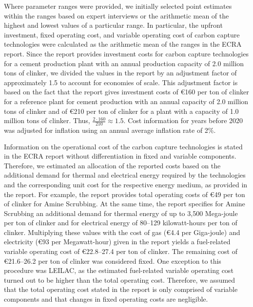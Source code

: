 \documentclass[12pt, a4paper]{article} %
\begin{document}
Where parameter ranges were provided, we initially selected point estimates within the ranges based on expert interviews or the arithmetic mean of the highest and lowest values of a particular range. In particular, the upfront investment, fixed operating cost, and variable operating cost of carbon capture technologies were calculated as the arithmetic mean of the ranges in the ECRA report. Since the report provides investment costs for carbon capture technologies for a cement production plant with an annual production capacity of 2.0 million tons of clinker, we divided the values in the report by an adjustment factor of approximately 1.5 to account for economies of scale. This adjustment factor is based on the fact that the report gives investment costs of \euro 160 per ton of clinker for a reference plant for cement production with an annual capacity of 2.0 million tons of clinker and of \euro 210 per ton of clinker for a plant with a capacity of 1.0 million tons of clinker. Thus, $\frac{2 \cdot 160}{210} \approx 1.5$. Cost information for years before 2020 was adjusted for inflation using an annual average inflation rate of 2\%.

Information on the operational cost of the carbon capture technologies is stated in the ECRA report without differentiation in fixed and variable components. Therefore, we estimated an allocation of the reported costs based on the additional demand for thermal and electrical energy required by the technologies and the corresponding unit cost for the respective energy medium, as provided in the report. For example, the report provides total operating costs of \euro 49 per ton of clinker for Amine Scrubbing. At the same time, the report specifies for Amine Scrubbing an additional demand for thermal energy of up to 3,500 Mega-joule per ton of clinker and for electrical energy of 80--129 kilowatt-hours per ton of clinker. Multiplying these values with the cost of gas (\euro 4.4 per Giga-joule) and electricity (\euro 93 per Megawatt-hour) given in the report yields a fuel-related variable operating cost of \euro 22.8--27.4 per ton of clinker. The remaining cost of \euro 21.6--26.2 per ton of clinker was considered fixed. One exception to this procedure was LEILAC, as the estimated fuel-related variable operating cost turned out to be higher than the total operating cost. Therefore, we assumed that the total operating cost stated in the report is only comprised of variable components and that changes in fixed operating costs are negligible.
\end{document}
